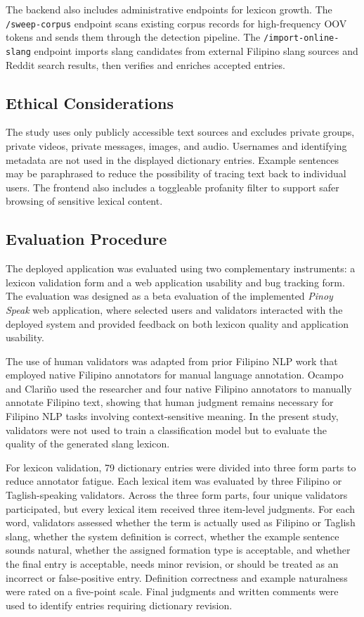 The backend also includes administrative endpoints for lexicon growth. The \texttt{/sweep-corpus} endpoint scans existing corpus records for high-frequency OOV tokens and sends them through the detection pipeline. The \texttt{/import-online-slang} endpoint imports slang candidates from external Filipino slang sources and Reddit search results, then verifies and enriches accepted entries.

\subsection{Ethical Considerations}
The study uses only publicly accessible text sources and excludes private groups, private videos, private messages, images, and audio. Usernames and identifying metadata are not used in the displayed dictionary entries. Example sentences may be paraphrased to reduce the possibility of tracing text back to individual users. The frontend also includes a toggleable profanity filter to support safer browsing of sensitive lexical content.

\subsection{Evaluation Procedure}
The deployed application was evaluated using two complementary instruments: a lexicon validation form and a web application usability and bug tracking form. The evaluation was designed as a beta evaluation of the implemented \textit{Pinoy Speak} web application, where selected users and validators interacted with the deployed system and provided feedback on both lexicon quality and application usability.

The use of human validators was adapted from prior Filipino NLP work that employed native Filipino annotators for manual language annotation. Ocampo and Clari\~no \cite{b12} used the researcher and four native Filipino annotators to manually annotate Filipino text, showing that human judgment remains necessary for Filipino NLP tasks involving context-sensitive meaning. In the present study, validators were not used to train a classification model but to evaluate the quality of the generated slang lexicon.

For lexicon validation, 79 dictionary entries were divided into three form parts to reduce annotator fatigue. Each lexical item was evaluated by three Filipino or Taglish-speaking validators. Across the three form parts, four unique validators participated, but every lexical item received three item-level judgments. For each word, validators assessed whether the term is actually used as Filipino or Taglish slang, whether the system definition is correct, whether the example sentence sounds natural, whether the assigned formation type is acceptable, and whether the final entry is acceptable, needs minor revision, or should be treated as an incorrect or false-positive entry. Definition correctness and example naturalness were rated on a five-point scale. Final judgments and written comments were used to identify entries requiring dictionary revision.

